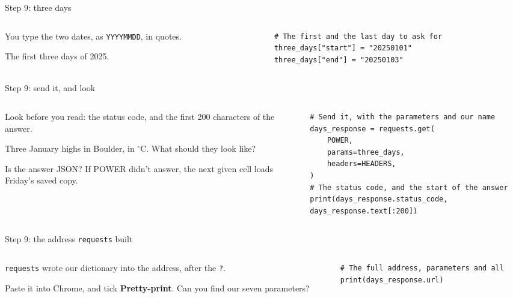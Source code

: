\documentclass[9pt,aspectratio=169]{beamer}
\begin{document}
\begin{frame}[fragile]{Step 9: three days}
    \begin{columns}[T]
        \begin{column}{0.37\textwidth}
            You type the two dates, as \texttt{YYYYMMDD}, in quotes.

            \medskip
            The first three days of 2025.
        \end{column}
        \begin{column}{0.6\textwidth}
\begin{lstlisting}
# The first and the last day to ask for
three_days["start"] = "20250101"
three_days["end"] = "20250103"
\end{lstlisting}
        \end{column}
    \end{columns}
\end{frame}

\begin{frame}[fragile]{Step 9: send it, and look}
    \begin{columns}[T]
        \begin{column}{0.37\textwidth}
            Look before you read: the status code, and the first 200 characters of the answer.

            \medskip
            Three January highs in Boulder, in $^\circ$C. What should they look like?

            \medskip
            Is the answer JSON? If POWER didn't answer, the next given cell loads Friday's saved copy.
        \end{column}
        \begin{column}{0.6\textwidth}
\begin{lstlisting}
# Send it, with the parameters and our name
days_response = requests.get(
    POWER,
    params=three_days,
    headers=HEADERS,
)
# The status code, and the start of the answer
print(days_response.status_code, days_response.text[:200])
\end{lstlisting}
        \end{column}
    \end{columns}
\end{frame}

\begin{frame}[fragile]{Step 9: the address \texttt{requests} built}
    \begin{columns}[T]
        \begin{column}{0.37\textwidth}
            \texttt{requests} wrote our dictionary into the address, after the \texttt{?}.

            \medskip
            Paste it into Chrome, and tick \textbf{Pretty-print}. Can you find our seven parameters?
        \end{column}
        \begin{column}{0.6\textwidth}
\begin{lstlisting}
# The full address, parameters and all
print(days_response.url)
\end{lstlisting}
        \end{column}
    \end{columns}
\end{frame}
\end{document}
